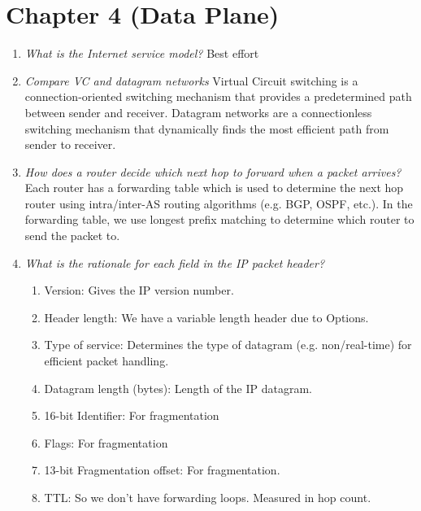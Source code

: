 \documentclass{article}
\begin{document}
\section*{Chapter 4 (Data Plane)}
\begin{enumerate}[label=\textit{(\roman*)}]
    \item \textit{What is the Internet service model?}
        \newline
        \newline
        Best effort
    \item \textit{Compare VC and datagram networks}
        \newline
        \newline
        Virtual Circuit switching is a connection-oriented switching mechanism that provides
            a predetermined path between sender and receiver. Datagram networks are a connectionless
        switching mechanism that dynamically finds the most efficient path from sender to receiver.
    \item \textit{How does a router decide which next hop to forward when a packet arrives?}
        \newline
        \newline
        Each router has a forwarding table which is used to determine the next hop router
        using intra/inter-AS routing algorithms (e.g. BGP, OSPF, etc.). In the forwarding table,
    we use longest prefix matching to determine which router to send the packet to.
    \item \textit{What is the rationale for each field in the IP packet header?}
        \begin{enumerate}
            \item Version: Gives the IP version number.
            \item Header length: We have a variable length header due to Options.
            \item Type of service: Determines the type of datagram (e.g. non/real-time) for efficient
                packet handling.
            \item Datagram length (bytes): Length of the IP datagram.
            \item 16-bit Identifier: For fragmentation
            \item Flags: For fragmentation
            \item 13-bit Fragmentation offset: For fragmentation.
            \item TTL: So we don't have forwarding loops. Measured in hop count.

\end{enumerate}
\end{enumerate}
\end{document}
